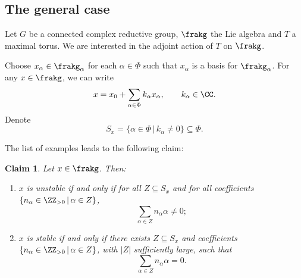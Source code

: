 \documentclass[12pt]{amsart}
\theoremstyle{plain}
\newtheorem{claim}[theorem]{Claim}
\begin{document}

\subsection{The general case}
Let $G$ be a connected complex reductive group, $\frakg$ the Lie algebra and $T$ a maximal torus.
We are interested in the adjoint action of $T$ on $\frakg$.

Choose $x_\alpha \in \frakg_\alpha$ for each $\alpha \in \Phi$ such that $x_\alpha$ is a basis for $\frakg_\alpha$.
For any $x \in \frakg$, we can write
$$x = x_0 + \sum_{\alpha \in \Phi} k_\alpha x_\alpha, \qquad k_\alpha \in \CC.$$
Denote
$$S_x = \{\alpha \in \Phi \, | \, k_\alpha \ne 0\} \subseteq \Phi.$$

The list of examples leads to the following claim:

\begin{claim}
Let $x \in \frakg$.
Then:
\begin{enumerate}%
\item
$x$ is unstable if and only if for all $Z \subseteq S_x$ and for all coefficients $\{n_\alpha \in \ZZ_{>0} \, | \, \alpha \in Z\}$, 
$$\sum_{\alpha \in Z} n_\alpha \alpha \ne 0;$$

\item
$x$ is stable if and only if there exists $Z \subseteq S_x$ and coefficients $\{n_\alpha \in \ZZ_{>0} \, | \, \alpha \in Z\}$, with $|Z|$ sufficiently large, such that
$$\sum_{\alpha \in Z} n_\alpha \alpha = 0.$$
\end{enumerate}
\end{claim}
\end{document}
